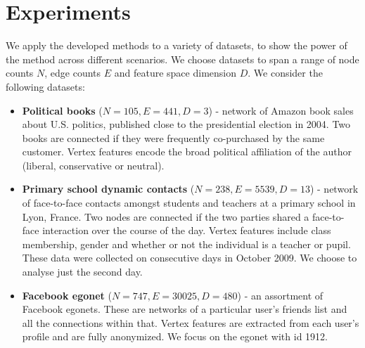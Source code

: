 \section{Experiments}

We apply the developed methods to a variety of datasets, to show the power of the method across different scenarios. We choose datasets to span a range of node counts $N$, edge counts $E$ and feature space dimension $D$. We consider the following datasets:

\begin{itemize}
	\item \textbf{Political books} \cite{polbooks} ($N=105, E=441, D=3$) - network of Amazon book sales about U.S. politics, published close to the presidential election in 2004. Two books are connected if they were frequently co-purchased by the same customer. Vertex features encode the broad political affiliation of the author (liberal, conservative or neutral).
		
	\item \textbf{Primary school dynamic contacts} \cite{schools} ($N=238, E=5539, D=13$) - network of face-to-face contacts amongst students and teachers at a primary school in Lyon, France. Two nodes are connected if the two parties shared a face-to-face interaction over the course of the day. Vertex features include class membership, gender and whether or not the individual is a teacher or pupil. These data were collected on consecutive days in October 2009. We choose to analyse just the second day.
	
	\item \textbf{Facebook egonet} \cite{fb-snap} ($N=747, E=30025, D=480$) - an assortment of Facebook egonets. These are networks of a particular user's friends list and all the connections within that. Vertex features are extracted from each user's profile and are fully anonymized. We focus on the egonet with id 1912.
	
%		
%	

\end{itemize}

